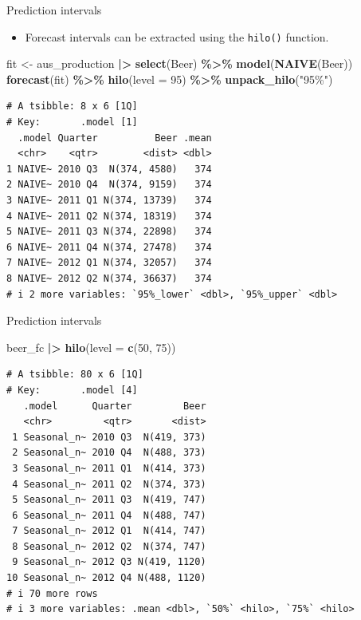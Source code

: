 \documentclass[
  14pt,
  ignorenonframetext,
  aspectratio=169,
]{beamer}
\newenvironment{Shaded}{\begin{snugshade}}{\end{snugshade}}
\newcommand{\AttributeTok}[1]{\textcolor[rgb]{0.13,0.29,0.53}{#1}}
\newcommand{\DecValTok}[1]{\textcolor[rgb]{0.00,0.00,0.81}{#1}}
\newcommand{\FunctionTok}[1]{\textcolor[rgb]{0.13,0.29,0.53}{\textbf{#1}}}
\newcommand{\NormalTok}[1]{#1}
\newcommand{\OtherTok}[1]{\textcolor[rgb]{0.56,0.35,0.01}{#1}}
\newcommand{\SpecialCharTok}[1]{\textcolor[rgb]{0.81,0.36,0.00}{\textbf{#1}}}
\newcommand{\StringTok}[1]{\textcolor[rgb]{0.31,0.60,0.02}{#1}}
\providecommand{\tightlist}{%
  \setlength{\itemsep}{0pt}\setlength{\parskip}{0pt}}
\renewenvironment{Shaded}{\vspace*{0.15cm}\color{black}\fontsize{10}{10}\sf\begin{snugshade}\color{black}}{\end{snugshade}}
\begin{document}
\begin{frame}[fragile]{Prediction intervals}
\protect{}\label{prediction-intervals}
\begin{itemize}
\tightlist
\item
  Forecast intervals can be extracted using the \texttt{hilo()}
  function.
\end{itemize}

\fontsize{10}{13}\sf

\begin{Shaded}
\begin{Highlighting}[]
\NormalTok{fit }\OtherTok{\textless{}{-}}\NormalTok{ aus\_production }\SpecialCharTok{|\textgreater{}} \FunctionTok{select}\NormalTok{(Beer) }\SpecialCharTok{\%\textgreater{}\%} \FunctionTok{model}\NormalTok{(}\FunctionTok{NAIVE}\NormalTok{(Beer))}
\FunctionTok{forecast}\NormalTok{(fit) }\SpecialCharTok{\%\textgreater{}\%} \FunctionTok{hilo}\NormalTok{(}\AttributeTok{level =} \DecValTok{95}\NormalTok{) }\SpecialCharTok{\%\textgreater{}\%} \FunctionTok{unpack\_hilo}\NormalTok{(}\StringTok{"95\%"}\NormalTok{)}
\end{Highlighting}
\end{Shaded}

\begin{verbatim}
# A tsibble: 8 x 6 [1Q]
# Key:       .model [1]
  .model Quarter          Beer .mean
  <chr>    <qtr>        <dist> <dbl>
1 NAIVE~ 2010 Q3  N(374, 4580)   374
2 NAIVE~ 2010 Q4  N(374, 9159)   374
3 NAIVE~ 2011 Q1 N(374, 13739)   374
4 NAIVE~ 2011 Q2 N(374, 18319)   374
5 NAIVE~ 2011 Q3 N(374, 22898)   374
6 NAIVE~ 2011 Q4 N(374, 27478)   374
7 NAIVE~ 2012 Q1 N(374, 32057)   374
8 NAIVE~ 2012 Q2 N(374, 36637)   374
# i 2 more variables: `95%_lower` <dbl>, `95%_upper` <dbl>
\end{verbatim}
\end{frame}

\begin{frame}[fragile]{Prediction intervals}
\protect{}\label{prediction-intervals-1}
\fontsize{10}{12}\sf

\begin{Shaded}
\begin{Highlighting}[]
\NormalTok{beer\_fc }\SpecialCharTok{|\textgreater{}}
  \FunctionTok{hilo}\NormalTok{(}\AttributeTok{level =} \FunctionTok{c}\NormalTok{(}\DecValTok{50}\NormalTok{, }\DecValTok{75}\NormalTok{))}
\end{Highlighting}
\end{Shaded}

\begin{verbatim}
# A tsibble: 80 x 6 [1Q]
# Key:       .model [4]
   .model      Quarter         Beer
   <chr>         <qtr>       <dist>
 1 Seasonal_n~ 2010 Q3  N(419, 373)
 2 Seasonal_n~ 2010 Q4  N(488, 373)
 3 Seasonal_n~ 2011 Q1  N(414, 373)
 4 Seasonal_n~ 2011 Q2  N(374, 373)
 5 Seasonal_n~ 2011 Q3  N(419, 747)
 6 Seasonal_n~ 2011 Q4  N(488, 747)
 7 Seasonal_n~ 2012 Q1  N(414, 747)
 8 Seasonal_n~ 2012 Q2  N(374, 747)
 9 Seasonal_n~ 2012 Q3 N(419, 1120)
10 Seasonal_n~ 2012 Q4 N(488, 1120)
# i 70 more rows
# i 3 more variables: .mean <dbl>, `50%` <hilo>, `75%` <hilo>
\end{verbatim}
\end{frame}
\end{document}

